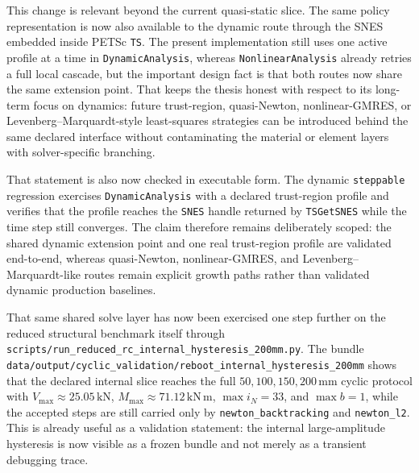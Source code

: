 This change is relevant beyond the current quasi-static slice.  The same
policy representation is now also available to the dynamic route through the
SNES embedded inside PETSc \texttt{TS}.  The present implementation still uses
one active profile at a time in \texttt{DynamicAnalysis}, whereas
\texttt{NonlinearAnalysis} already retries a full local cascade, but the
important design fact is that both routes now share the same extension point.
That keeps the thesis honest with respect to its long-term focus on dynamics:
future trust-region, quasi-Newton, nonlinear-GMRES, or
Levenberg--Marquardt-style least-squares strategies can be introduced behind
the same declared interface without contaminating the material or element
layers with solver-specific branching.

That statement is also now checked in executable form.  The dynamic
\texttt{steppable} regression exercises \texttt{DynamicAnalysis} with a
declared trust-region profile and verifies that the profile reaches the
\texttt{SNES} handle returned by \texttt{TSGetSNES} while the time step still
converges.  The claim therefore remains deliberately scoped: the shared dynamic
extension point and one real trust-region profile are validated end-to-end,
whereas quasi-Newton, nonlinear-GMRES, and Levenberg--Marquardt-like routes
remain explicit growth paths rather than validated dynamic production
baselines.

That same shared solve layer has now been exercised one step further on the
reduced structural benchmark itself through
\texttt{scripts/run\_reduced\_rc\_internal\_hysteresis\_200mm.py}.  The bundle
\texttt{data/output/cyclic\_validation/reboot\_internal\_hysteresis\_200mm}
shows that the declared internal slice reaches the full
\(50,100,150,200\,\mathrm{mm}\) cyclic protocol with
\(V_{\max}\approx 25.05\,\mathrm{kN}\),
\(M_{\max}\approx 71.12\,\mathrm{kN\,m}\),
\(\max i_N = 33\), and \(\max b = 1\), while the accepted steps are still
carried only by \texttt{newton\_backtracking} and \texttt{newton\_l2}.  This is
already useful as a validation statement: the internal large-amplitude
hysteresis is now visible as a frozen bundle and not merely as a transient
debugging trace.

